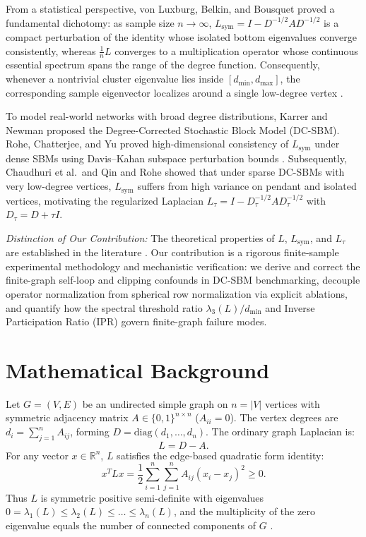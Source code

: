 \documentclass[10pt,twocolumn,a4paper]{article}
\begin{document}
From a statistical perspective, von Luxburg, Belkin, and Bousquet \cite{vonluxburg2008consistency} proved a fundamental dichotomy: as sample size $n \to \infty$, $L_{\mathrm{sym}} = I - D^{-1/2}AD^{-1/2}$ is a compact perturbation of the identity whose isolated bottom eigenvalues converge consistently, whereas $\frac{1}{n}L$ converges to a multiplication operator whose continuous essential spectrum spans the range of the degree function. Consequently, whenever a nontrivial cluster eigenvalue lies inside $[d_{\min}, d_{\max}]$, the corresponding sample eigenvector localizes around a single low-degree vertex \cite{vonluxburg2007tutorial,vonluxburg2008consistency}.

To model real-world networks with broad degree distributions, Karrer and Newman \cite{karrer2011stochastic} proposed the Degree-Corrected Stochastic Block Model (DC-SBM). Rohe, Chatterjee, and Yu \cite{rohe2011spectral} proved high-dimensional consistency of $L_{\mathrm{sym}}$ under dense SBMs using Davis--Kahan subspace perturbation bounds \cite{yu2015useful}. Subsequently, Chaudhuri et al.\ and Qin and Rohe \cite{qin2013regularized} showed that under sparse DC-SBMs with very low-degree vertices, $L_{\mathrm{sym}}$ suffers from high variance on pendant and isolated vertices, motivating the regularized Laplacian $L_\tau = I - D_\tau^{-1/2} A D_\tau^{-1/2}$ with $D_\tau = D + \tau I$.

\emph{Distinction of Our Contribution:} The theoretical properties of $L$, $L_{\mathrm{sym}}$, and $L_\tau$ are established in the literature \cite{vonluxburg2008consistency,karrer2011stochastic,qin2013regularized}. Our contribution is a rigorous finite-sample experimental methodology and mechanistic verification: we derive and correct the finite-graph self-loop and clipping confounds in DC-SBM benchmarking, decouple operator normalization from spherical row normalization via explicit ablations, and quantify how the spectral threshold ratio $\lambda_3(L)/d_{\min}$ and Inverse Participation Ratio ($\mathrm{IPR}$) govern finite-graph failure modes.

\section{Mathematical Background}
Let $G = (V, E)$ be an undirected simple graph on $n = |V|$ vertices with symmetric adjacency matrix $A \in \{0,1\}^{n \times n}$ ($A_{ii} = 0$). The vertex degrees are $d_i = \sum_{j=1}^n A_{ij}$, forming $D = \mathrm{diag}(d_1, \dots, d_n)$. The ordinary graph Laplacian is:
\begin{equation}
    L = D - A.
\end{equation}
For any vector $x \in \mathbb{R}^n$, $L$ satisfies the edge-based quadratic form identity:
\begin{equation}
    x^T L x = \frac{1}{2} \sum_{i=1}^n \sum_{j=1}^n A_{ij} (x_i - x_j)^2 \ge 0.
    \label{eq:quadform}
\end{equation}
Thus $L$ is symmetric positive semi-definite with eigenvalues $0 = \lambda_1(L) \le \lambda_2(L) \le \dots \le \lambda_n(L)$, and the multiplicity of the zero eigenvalue equals the number of connected components of $G$ \cite{vonluxburg2007tutorial}.
\end{document}
